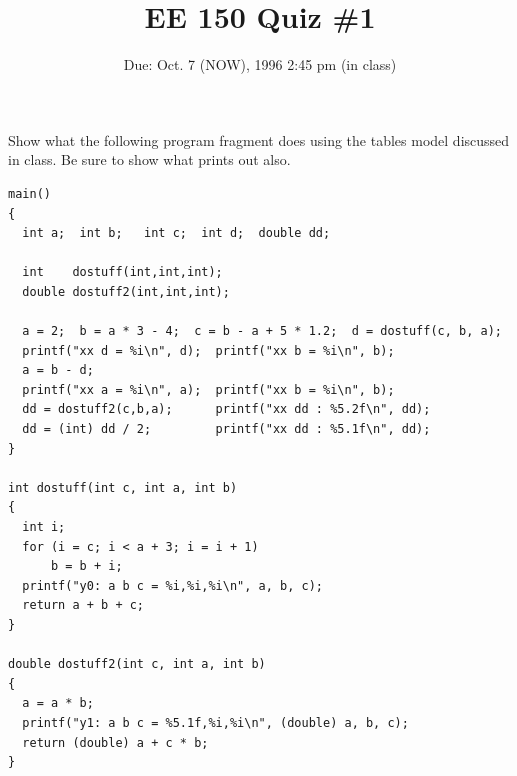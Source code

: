 \setcounter{page}{1}



\title{EE 150 Quiz \#1}
\author{Due: Oct. 7 (NOW), 1996 2:45 pm (in class)}
\date{}
\maketitle

Show what the following program fragment does using the tables model
discussed in class. Be sure to show what prints out also.

\begin{verbatim}
main()
{
  int a;  int b;   int c;  int d;  double dd;

  int    dostuff(int,int,int);
  double dostuff2(int,int,int);

  a = 2;  b = a * 3 - 4;  c = b - a + 5 * 1.2;  d = dostuff(c, b, a);
  printf("xx d = %i\n", d);  printf("xx b = %i\n", b);
  a = b - d;
  printf("xx a = %i\n", a);  printf("xx b = %i\n", b);
  dd = dostuff2(c,b,a);      printf("xx dd : %5.2f\n", dd);
  dd = (int) dd / 2;         printf("xx dd : %5.1f\n", dd);
}

int dostuff(int c, int a, int b)
{ 
  int i;
  for (i = c; i < a + 3; i = i + 1) 
      b = b + i;
  printf("y0: a b c = %i,%i,%i\n", a, b, c);
  return a + b + c;
}

double dostuff2(int c, int a, int b)
{
  a = a * b;
  printf("y1: a b c = %5.1f,%i,%i\n", (double) a, b, c);
  return (double) a + c * b;
}
\end{verbatim}

